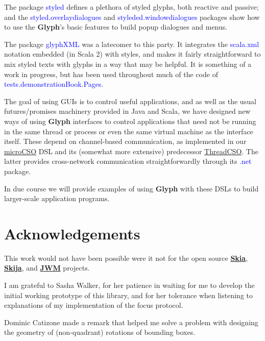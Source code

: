 \documentclass[12pt,a4paper]{article}
\def\Glyph{\textbf{Glyph}\xspace}
\def\Scala#1{\textcolor{blue}{\textsf{#1}}}
\def\S#1{\section{#1}}
\begin{document}
The package \Scala{styled} defines a plethora of styled glyphs,
both reactive and passive; and the \Scala{styled.overlaydialogues}
and \Scala{styleded.windowdialogues} packages show how to use the
\Glyph's basic features to build popup dialogues and menus.

The package \Scala{glyphXML} was a latecomer to this party. It
integrates the \Scala{scala.xml}  notation embedded (in Scala 2)
with styles, and makes it fairly straightforward to mix styled
texts with glyphs in a way that may be helpful. It is
something of a work in progress, but has been used throughout much
of the code of \Scala{tests.demonstrationBook.Pages}.

The goal of using  GUIs is to control useful applications,
and as well as the usual futures/promises machinery provided
in Java and Scala, we have designed new ways of using \Glyph interfaces to
control applications that need not be running in the same thread or process
or even the same virtual machine as the interface itself. These depend
on channel-based communication, as implemented in our
\href{https://github.com/sufrin/microCSO}{microCSO}
DSL and its (somewhat more extensive) predecessor
\href{https://github.com/sufrin/ThreadCSO}{ThreadCSO}. The latter
provides cross-network communication straightforwardly through its
\Scala{.net} package.

In due course we will provide examples of using \Glyph with these DSLs
to build larger-scale application programs.



\S{Acknowledgements}
This work would not have been possible were it not for the
open source \href{https://skia.org/}{\textbf{Skia}},
\href{https://github.com/HumbleUI/HumbleUI}{\textbf{Skija}},
and \href{https://github.com/HumbleUI/JWM}{\textbf{JWM}} projects.

I am grateful to Sasha Walker,
for her patience in waiting for me to develop the initial working prototype of this
library, and for her tolerance when listening to explanations of my implementation
of the focus protocol. 

Dominic Catizone\Footnotemark{$*$} made a remark that helped me solve a
problem with designing the geometry of (non-quadrant) rotations of bounding boxes.
\end{document}
